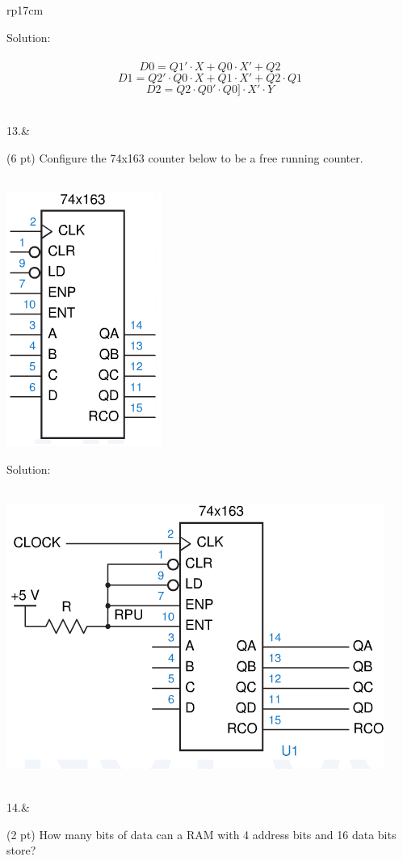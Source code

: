 \documentclass{article}
\begin{document}
\begin{longtable}[l]{rp{17cm}}
\begin{minipage}[t]{\linewidth}
Solution: \\ \\
$$D0 = Q1' \cdot X + Q0 \cdot X' + Q2$$
$$D1 = Q2' \cdot Q0 \cdot X + Q1 \cdot X' + Q2 \cdot Q1$$
$$D2 = Q2 \cdot Q0' \cdot Q0] \cdot X' \cdot Y$$
\end{minipage}\\
\medskip
13.&\begin{minipage}[t]{\linewidth}(6 pt) Configure the 74x163 counter below to be a free running counter. \\ \\
\begin{center}
  \includegraphics[scale=0.5]{../Counters/Assessments/74x163Schematic}
\end{center}

Solution: \\ \\
\begin{center}
  \includegraphics[scale=0.4]{../Counters/Assessments/74x163SchematicFreeRunning}
\end{center}
\end{minipage}\\
\medskip
14.&\begin{minipage}[t]{\linewidth}(2 pt) How many bits of data can a RAM with 4 address bits and 16 data bits store?\\ \\


\end{minipage}
\end{longtable}
\end{document}
